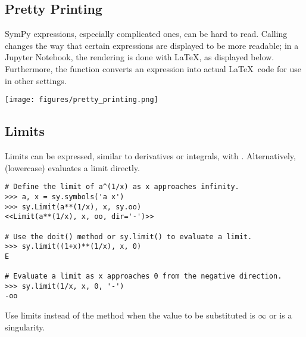 \subsection*{Pretty Printing} %

SymPy expressions, especially complicated ones, can be hard to read.
Calling  changes the way that certain expressions are displayed to be more readable; in a Jupyter Notebook, the rendering is done with \LaTeX, as displayed below.
Furthermore, the function  converts an expression into actual \LaTeX \ code for use in other settings.

\begin{center}
\texttt{[image: figures/pretty\_printing.png]}
\end{center}

%

\subsection*{Limits} %

Limits can be expressed, similar to derivatives or integrals, with .
Alternatively,  (lowercase) evaluates a limit directly.

\begin{lstlisting}
# Define the limit of a^(1/x) as x approaches infinity.
>>> a, x = sy.symbols('a x')
>>> sy.Limit(a**(1/x), x, sy.oo)
<<Limit(a**(1/x), x, oo, dir='-')>>

# Use the doit() method or sy.limit() to evaluate a limit.
>>> sy.limit((1+x)**(1/x), x, 0)
E

# Evaluate a limit as x approaches 0 from the negative direction.
>>> sy.limit(1/x, x, 0, '-')
-oo
\end{lstlisting}

Use limits instead of the  method when the value to be substituted is $\infty$ or is a singularity.

